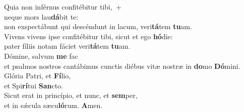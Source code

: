 \oddverse Quia non inférnus confitébitur tibi,~+\\
\oddverse  neque mors lau\textbf{dá}bit te:~\*\\
\oddverse non exspectábunt qui descéndunt in lacum, veri\textbf{tá}tem \textbf{tu}am.\\
\evenverse Vivens vivens ipse confitébitur tibi, sicut et ego \textbf{hó}die:~\*\\
\evenverse pater fíliis notam fáciet veri\textbf{tá}tem \textbf{tu}am.\\
\oddverse Dómine, salvum \textbf{me} fac~\*\\
\oddverse et psalmos nostros cantábimus cunctis diébus vitæ nostræ in \textbf{do}mo \textbf{Dó}mini.\\
\evenverse Glória Patri, et \textbf{Fí}lio,~\*\\
\evenverse et Spi\textbf{rí}tui \textbf{San}cto.\\
\oddverse Sicut erat in princípio, et nunc, et \textbf{sem}per,~\*\\
\oddverse et in sǽcula sæcu\textbf{ló}rum. \textbf{A}men.\\
